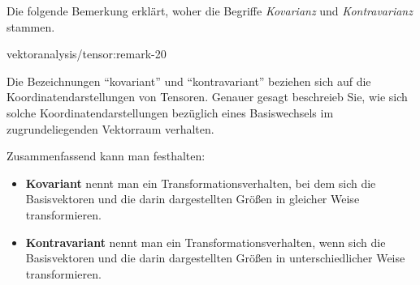 \documentclass[letterpaper,10pt,english]{jupyterBook}
\begin{document}
\par
Die folgende Bemerkung erklärt, woher die Begriffe \emph{Kovarianz} und \emph{Kontravarianz} stammen.
\begin{remark}{}{vektoranalysis/tensor:remark-20}



\par
Die Bezeichnungen “kovariant” und “kontravariant” beziehen sich auf die Koordinatendarstellungen von Tensoren.
Genauer gesagt beschreieb Sie, wie sich solche Koordinatendarstellungen bezüglich eines Basiswechsels im zugrundeliegenden Vektorraum verhalten.

\par
Zusammenfassend kann man festhalten:
\begin{itemize}
\item {} 
\par
\textbf{Kovariant} nennt man ein Transformationsverhalten, bei dem sich die Basisvektoren und die darin dargestellten Größen in gleicher Weise transformieren.

\item {} 
\par
\textbf{Kontravariant} nennt man ein Transformationsverhalten, wenn sich die Basisvektoren und die darin dargestellten Größen in unterschiedlicher Weise transformieren.

\end{itemize}
\end{remark}
\end{document}
